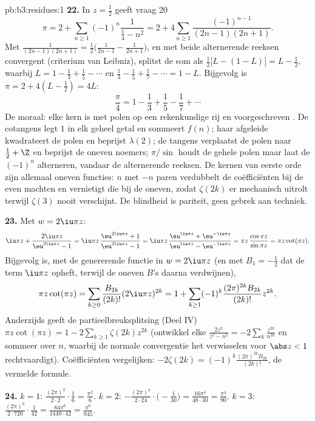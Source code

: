 \begin{solution}{pb:b3:residues:1}
\textbf{22.} In $z = \frac12$ geeft vraag 20
\[
\pi = 2 + \sum_{n\geq1}(-1)^n\frac{1}{\frac14 - n^2}
= 2 + 4\sum_{n\geq1}\frac{(-1)^{n-1}}{(2n-1)(2n+1)} .
\]
Met $\frac1{(2n-1)(2n+1)} = \frac12\bigl(\frac1{2n-1} -
\frac1{2n+1}\bigr)$, en met beide alternerende reeksen convergent
(criterium van Leibniz), splitst de som als $\frac12\bigl[L - (1
- L)\bigr] = L - \frac12$, waarbij $L = 1 - \frac13 + \frac15 -
\cdots$ en $\frac13 - \frac15 + \frac17 - \cdots = 1 - L$.
Bijgevolg is $\pi = 2 + 4(L - \frac12) = 4L$:
\[
\frac\pi4 = 1 - \frac13 + \frac15 - \frac17 + \cdots
\]
De moraal: elke kern is  met polen op een rekenkundige
rij en voorgeschreven . De cotangens legt  $1$ in
elk geheel getal en sommeert $f(n)$; haar afgeleide kwadrateert
de polen en beprijst $\lambda(2)$; de tangens verplaatst de polen
naar $\frac12 + \Z$ en beprijst de oneven noemers;
$\pi/\sin$ houdt de gehele polen maar laat de  $(-1)^n$
alterneren, vandaar de alternerende reeksen. De kernen van eerste
orde zijn allemaal oneven functies: $n$ met $-n$ paren verdubbelt
de coëfficiënten bij de even machten en vernietigt die bij de
oneven, zodat $\zeta(2k)$ er mechanisch uitrolt terwijl
$\zeta(3)$ nooit verschijnt. De blindheid is pariteit, geen
gebrek aan techniek.

\textbf{23.} Met $w = 2\iu\pi z$:
\[
\iu\pi z + \frac{2\iu\pi z}{\eu^{2\iu\pi z} - 1}
= \iu\pi z\,\frac{\eu^{2\iu\pi z} + 1}{\eu^{2\iu\pi z} - 1}
= \iu\pi z\,\frac{\eu^{\iu\pi z} +
\eu^{-\iu\pi z}}{\eu^{\iu\pi z} - \eu^{-\iu\pi z}}
= \pi z\,\frac{\cos\pi z}{\sin\pi z} = \pi z\cot(\pi z) .
\]
Bijgevolg is, met de genererende functie in $w = 2\iu\pi z$ (en
met $B_1 = -\frac12$ dat de term $\iu\pi z$ opheft, terwijl de
oneven $B$'s daarna verdwijnen),
\[
\pi z\cot(\pi z) = \sum_{k\geq0}\frac{B_{2k}}{(2k)!}
(2\iu\pi z)^{2k}
= 1 + \sum_{k\geq1}(-1)^k\frac{(2\pi)^{2k}B_{2k}}{(2k)!}
z^{2k} .
\]
Anderzijds geeft de partieelbreuksplitsing (Deel IV) $\pi
z\cot(\pi z) = 1 - 2\sum_{k\geq1}\zeta(2k)z^{2k}$ (ontwikkel elke
$\frac{2z^2}{z^2 - n^2} = -2\sum_k\frac{z^{2k}}{n^{2k}}$ en
sommeer over $n$, waarbij de normale convergentie het verwisselen
voor $\abs z < 1$ rechtvaardigt). Coëfficiënten vergelijken:
$-2\zeta(2k) = (-1)^k\frac{(2\pi)^{2k}B_{2k}}{(2k)!}$, de
vermelde formule.

\textbf{24.} $k = 1$: $\frac{(2\pi)^2}{2\cdot2}\cdot\frac16 =
\frac{\pi^2}6$. $k = 2$: $-\frac{(2\pi)^4}{2\cdot24}
\cdot\bigl(-\frac1{30}\bigr) = \frac{16\pi^4}{48\cdot30} =
\frac{\pi^4}{90}$. $k = 3$: $\frac{(2\pi)^6}{2\cdot720}
\cdot\frac1{42} = \frac{64\pi^6}{1440\cdot42} =
\frac{\pi^6}{945}$.


\end{solution}
